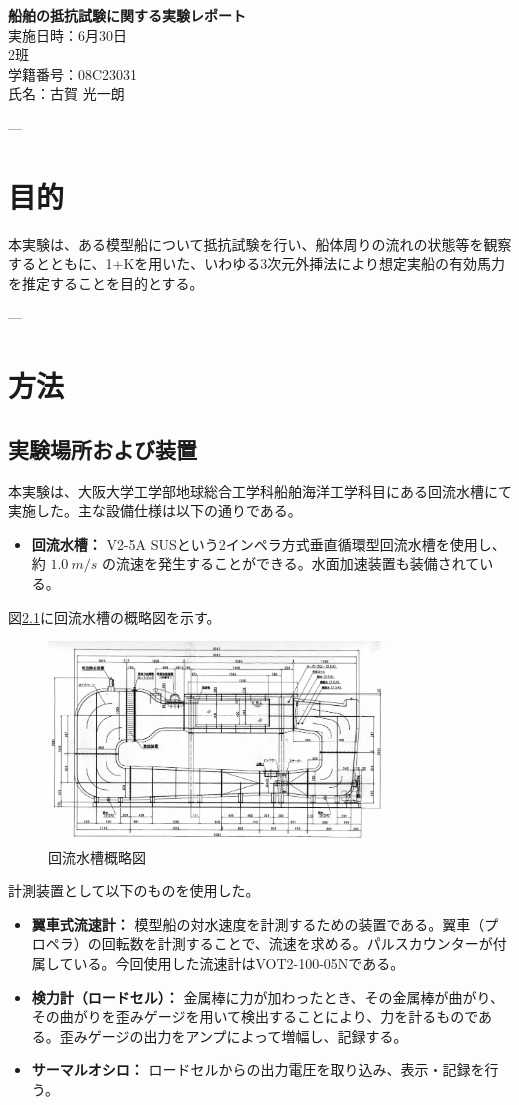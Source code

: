 \documentclass[dvipdfmx,a4paper]{jreport} %
\def\titlepage{%
\thispagestyle{empty}%
\begin{center}%
    \vspace*{\fill}%
    {\huge \bfseries 船舶の抵抗試験に関する実験レポート \\}%
    \vspace{2cm}%
    {\large 実施日時：6月30日\\}%
    \vspace{1cm}%
    {\large 2班\\}%
    \vspace{1cm}%
    {\large 学籍番号：08C23031\\}%
    \vspace{1cm}%
    {\large 氏名：古賀 光一朗 \\}%
    \vspace*{\fill}%
\end{center}%
}
\begin{document}
\titlepage

---

\chapter{目的}
本実験は、ある模型船について抵抗試験を行い、船体周りの流れの状態等を観察するとともに、1+Kを用いた、いわゆる3次元外挿法により想定実船の有効馬力を推定することを目的とする。

---

\chapter{方法}
\section{実験場所および装置}
本実験は、大阪大学工学部地球総合工学科船舶海洋工学科目にある回流水槽にて実施した。主な設備仕様は以下の通りである。

\begin{itemize}
    \item \textbf{回流水槽：} V2-5A SUSという2インペラ方式垂直循環型回流水槽を使用し、約 $1.0~m/s$ の流速を発生することができる。水面加速装置も装備されている。
\end{itemize}

図\ref{fig:recirculating_water_channel}に回流水槽の概略図を示す。

\begin{figure}[H] %
    \centering
    \includegraphics[width=0.8\textwidth]{summer/ship-experiment/circulating-water-channel/recirculating_water_channel.png} 
    \caption{回流水槽概略図}
    \label{fig:recirculating_water_channel}
\end{figure}

計測装置として以下のものを使用した。
\begin{itemize}
    \item \textbf{翼車式流速計：} 模型船の対水速度を計測するための装置である。翼車（プロペラ）の回転数を計測することで、流速を求める。パルスカウンターが付属している。今回使用した流速計はVOT2-100-05Nである。
    \item \textbf{検力計（ロードセル）：} 金属棒に力が加わったとき、その金属棒が曲がり、その曲がりを歪みゲージを用いて検出することにより、力を計るものである。歪みゲージの出力をアンプによって増幅し、記録する。
    \item \textbf{サーマルオシロ：} ロードセルからの出力電圧を取り込み、表示・記録を行う。
\end{itemize}
\end{document}
